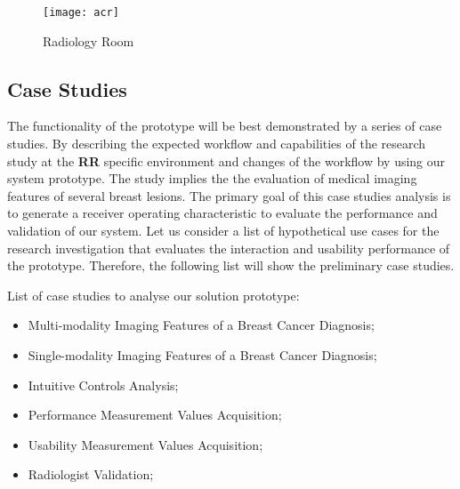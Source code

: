 
\hfill

\begin{figure}[h]
\centering
\texttt{[image: acr]}
\caption{Radiology Room}
\label{fig:radioroom}
\end{figure}

\hfill



\subsection{Case Studies}

The functionality of the prototype will be best demonstrated by a series of case studies. By describing the expected workflow and capabilities of the research study at the \textbf{RR} specific environment and changes of the workflow by using our system prototype. The study implies the the evaluation of medical imaging features of several breast lesions. The primary goal of this case studies analysis is to generate a receiver operating characteristic to evaluate the performance and validation of our system. Let us consider a list of hypothetical use cases for the research investigation that evaluates the interaction and usability performance of the prototype. Therefore, the following list will show the preliminary case studies.

\hfill

List of case studies to analyse our solution prototype:

\hfill

\begin{itemize}
\item Multi-modality Imaging Features of a Breast Cancer Diagnosis;
\item Single-modality Imaging Features of a Breast Cancer Diagnosis;
\item Intuitive Controls Analysis;
\item Performance Measurement Values Acquisition;
\item Usability Measurement Values Acquisition;
\item Radiologist Validation;
\end{itemize}

